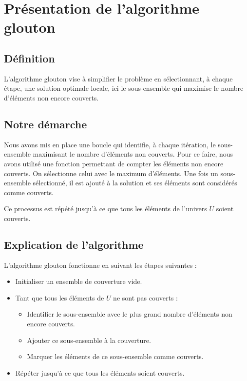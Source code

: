 \documentclass[a4paper, 12pt, twoside]{article}
\begin{document}
\section{Présentation de l'algorithme glouton}

\subsection{Définition}

L'algorithme glouton vise à simplifier le problème en sélectionnant, à chaque étape, une solution optimale locale, 
ici le sous-ensemble qui maximise le nombre d’éléments non encore couverts.

\subsection{Notre démarche}

Nous avons mis en place une boucle qui identifie, à chaque itération, le sous-ensemble maximisant 
le nombre d'éléments non couverts. Pour ce faire, nous avons utilisé une fonction permettant de compter 
les éléments non encore couverts. On sélectionne celui avec le maximum d'éléments. Une fois un sous-ensemble sélectionné,
il est ajouté à la solution et ses éléments sont considérés comme couverts.

Ce processus est répété jusqu'à ce que tous les éléments de l'univers \( U \) soient couverts.

\subsection{Explication de l'algorithme}

L'algorithme glouton fonctionne en suivant les étapes suivantes :

\begin{itemize}
    \item Initialiser un ensemble de couverture vide.
    \item Tant que tous les éléments de \( U \) ne sont pas couverts :
    \begin{itemize}
        \item Identifier le sous-ensemble avec le plus grand nombre d'éléments non encore couverts.
        \item Ajouter ce sous-ensemble à la couverture.
        \item Marquer les éléments de ce sous-ensemble comme couverts.
    \end{itemize}
    \item Répéter jusqu'à ce que tous les éléments soient couverts.
\end{itemize}
\end{document}
